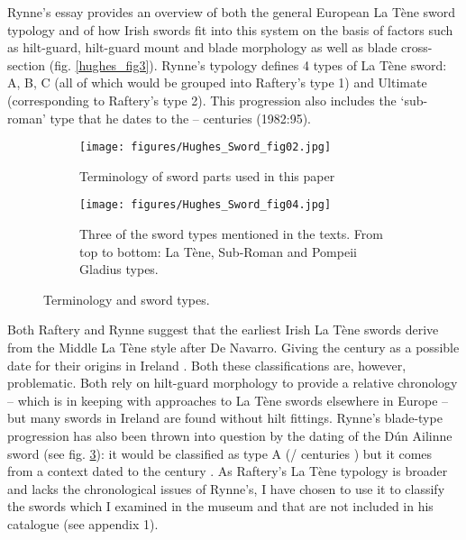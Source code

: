 Rynne’s \citeyear{Rynne1982} essay provides an overview of both the general European La Tène sword typology and of how Irish swords fit into this system on the basis of factors such as hilt-guard, hilt-guard mount and blade morphology as well as blade cross-section (fig. \ref{hughes_fig3}). 
Rynne’s typology defines 4 types of La Tène sword: A, B, C (all of which would be grouped into Raftery’s type 1) and Ultimate (corresponding to Raftery’s type 2). 
This progression also includes the ‘sub-roman’ type that he dates to the -- centuries (1982:95).


\begin{figure}[!tb]
\begin{subfigure}[b]{0.45\textwidth}
\texttt{[image: figures/Hughes\_Sword\_fig02.jpg]} 
\caption{Terminology of sword parts used in this paper}
\label{hughes_fig2}
\end{subfigure}
\hfill
\begin{subfigure}[b]{0.45\textwidth}
\texttt{[image: figures/Hughes\_Sword\_fig04.jpg]} 
\caption{Three of the sword types mentioned in the texts. From top to bottom: La Tène, Sub-Roman and Pompeii Gladius types.}
\label{hughes_fig4}
\end{subfigure}
\caption{Terminology and sword types.}
\end{figure}

Both Raftery and Rynne suggest that the earliest Irish La Tène swords derive from the Middle La Tène style after De Navarro. Giving the  century \BC as a possible date for their origins in Ireland \parencites{DeNavarro1972}{Rynne1982}[83]{Raftery1983}. 
Both these classifications are, however, problematic. 
Both rely on hilt-guard morphology to provide a relative chronology -- which is in keeping with approaches to La Tène swords elsewhere in Europe 
\parencites(e.g.)(){DeNavarro1972}{Stead2006} -- but many swords in Ireland are found without hilt fittings. 
Rynne’s blade-type progression has also been thrown into question by the dating of the Dún Ailinne sword (see fig. \ref{hughes_fig4}): 
it would be classified as type A (/ centuries \BC) but it comes from a context dated to the  century \AD \parencite[88\psq]{Johnston2007}. 
As Raftery’s La Tène typology is broader and lacks the chronological issues of Rynne’s, I have chosen to use it to classify the swords which I examined in the museum and that are not included in his catalogue \parencite{Raftery1983} (see appendix 1).

